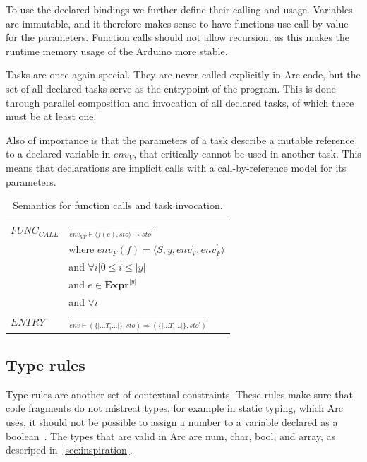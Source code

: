 To use the declared bindings we further define their calling and usage. Variables are immutable, and it therefore makes sense to have functions use call-by-value for the parameters. Function calls should not allow recursion, as this makes the runtime memory usage of the Arduino more stable.

Tasks are once again special. They are never called explicitly in Arc code, but the set of all declared tasks serve as the entrypoint of the program. This is done through parallel composition and invocation of all declared tasks, of which there must be at least one.

Also of importance is that the parameters of a task describe a mutable reference to a declared variable in $env_V$, that critically cannot be used in another task. This means that declarations are implicit calls with a call-by-reference model for its parameters.


\begin{table}[htb!]
    \centering
    \begin{tabular}{ll}
        \toprule
        $FUNC_{CALL}$ & $\frac{}
            {env_{VF} \vdash \langle f(e), sto\rangle \rightarrow sto^\prime}$                         \\ [12pt]
                      & where $env_F(f) = \langle S, y, env^\prime_V, env^\prime_F \rangle$            \\
                      & and $\forall i | 0 \leq i \leq |y|$                                            \\
                      & and $e \in \textbf{Expr}^{ |y| }$                                              \\
                      & and $\forall i $                                                               \\

        $ENTRY$       & $\frac{}
            {env \vdash (\{|\dots T_i \dots|\}, sto) \Rightarrow (\{|\dots T_i \dots|\}, sto^\prime)}$ \\ [12pt]
        \bottomrule
    \end{tabular}
    \caption{Semantics for function calls and task invocation.}
    \label{tab:callandentry}
\end{table}


\subsection{Type rules}\label{subsec:typerules}
Type rules are another set of contextual constraints. These rules make sure that code fragments do not mistreat types, for example in static typing, which Arc uses, it should not be possible to assign a number to a variable declared as a boolean~\cite{Sebesta2016}. The types that are valid in Arc are num, char, bool, and array, as descriped in~\ref{sec:inspiration}.

